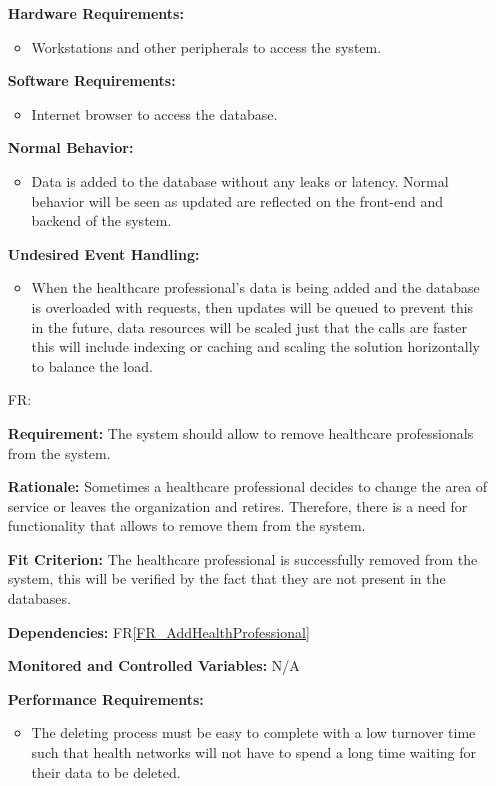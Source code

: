 \documentclass[12pt]{article}
\newcounter{reqnum} %
\begin{document}
\begin{itemize}
\textbf{Hardware Requirements:} 
\begin{itemize}
  \item Workstations and other peripherals to access the system.
\end{itemize}

\textbf{Software Requirements:} 
\begin{itemize}
  \item Internet browser to access the database.
\end{itemize}

\textbf{Normal Behavior:}
\begin{itemize}
  \item Data is added to the database without any leaks or latency. Normal behavior will be seen as updated are reflected on the front-end and backend of the system.
\end{itemize} 

\textbf{Undesired Event Handling:}
\begin{itemize}
  \item When the healthcare professional’s data is being added and the database is overloaded with requests, then updates will be queued to prevent this in the future, data resources will be scaled just that the calls are faster this will include indexing or caching and scaling the solution horizontally to balance the load.
\end{itemize} 

\item[FR\refstepcounter{reqnum}\thereqnum \label{FR_RemoveHealthProfessionals}:] 

\textbf{Requirement:} The system should allow to remove healthcare professionals from the system. 

\textbf{Rationale:} Sometimes a healthcare professional decides to change the area of service or leaves the organization and retires. Therefore, there is a need for functionality that allows to remove them from the system.

\textbf{Fit Criterion:} The healthcare professional is successfully removed from the system, this will be verified by the fact that they are not present in the databases. 

\textbf{Dependencies:} FR\ref{FR_AddHealthProfessional}

\textbf{Monitored and Controlled Variables:} N/A

\textbf{Performance Requirements:}
\begin{itemize}
  \item The deleting process must be easy to complete with a low turnover time such that health networks will not have to spend a long time waiting for their data to be deleted.
\end{itemize} 


\end{itemize}
\end{document}
